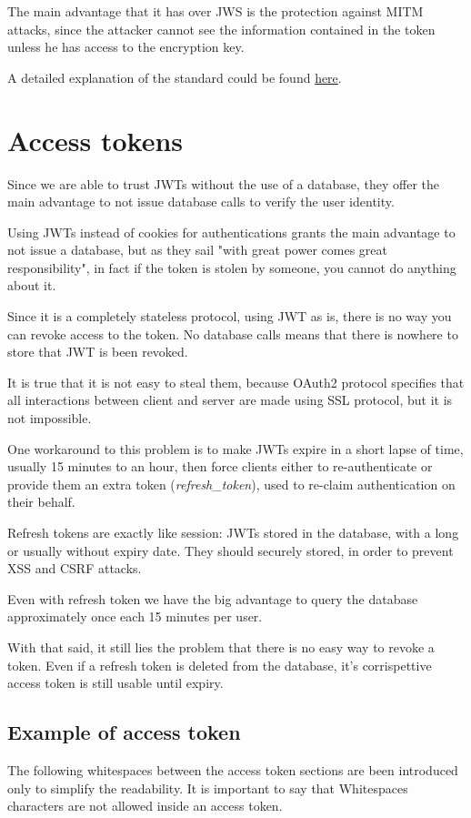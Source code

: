 \documentclass[11pt]{style}
\begin{document}
The main advantage that it has over JWS is the protection against MITM attacks,
since the attacker cannot see the information contained in the token unless he
has access to the encryption key.

A detailed explanation of the standard could be found
\href{https://tools.ietf.org/html/draft-ietf-jose-json-web-signature-41}{here}.


\section{Access tokens}
Since we are able to trust JWTs  without the use of a database, they offer the
main advantage to not issue database calls to verify the user identity.


Using JWTs instead of cookies for authentications grants the main advantage to
not issue a database, but as they sail "with great power comes great
responsibility", in fact if the token is stolen by someone, you cannot do
anything about it.

Since it is a completely stateless protocol, using JWT as is, there is no way
you can revoke access to the token. No database calls means that there is
nowhere to store that JWT is been revoked.

It is true that it is not easy to steal them, because OAuth2 protocol specifies
that all interactions between client and server are made using SSL protocol, but
it is not impossible.

One workaround to this problem is to make JWTs expire in a short lapse of time,
usually 15 minutes to an hour, then force clients either to re-authenticate or
provide them an extra token (\textit{refresh\_token}), used to re-claim
authentication on their behalf.

Refresh tokens are exactly like session: JWTs stored in the database, with a
long or usually without expiry date.
They should securely stored, in order to prevent XSS and CSRF attacks.

Even with refresh token we have the big advantage to query the database
approximately once each 15 minutes per user.

With that said, it still lies the problem that there is no easy way to revoke a
token. Even if a refresh token is deleted from the database, it's corrispettive
access token is still usable until expiry.

\subsection{Example of access token}
The following whitespaces between the access token sections are been introduced
only to simplify the readability.
It is important to say that Whitespaces characters are not allowed inside an
access token.
\end{document}
